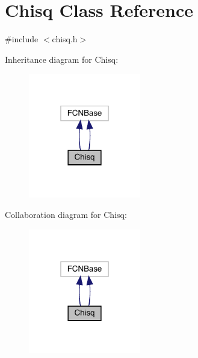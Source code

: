 \hypertarget{classChisq}{}\section{Chisq Class Reference}
\label{classChisq}


{\ttfamily \#include $<$chisq.\+h$>$}



Inheritance diagram for Chisq\+:
\nopagebreak
\begin{figure}[H]
\begin{center}
\leavevmode
\includegraphics[width=139pt]{d4/d39/classChisq__inherit__graph}
\end{center}
\end{figure}


Collaboration diagram for Chisq\+:
\nopagebreak
\begin{figure}[H]
\begin{center}
\leavevmode
\includegraphics[width=139pt]{d5/d97/classChisq__coll__graph}
\end{center}
\end{figure}
